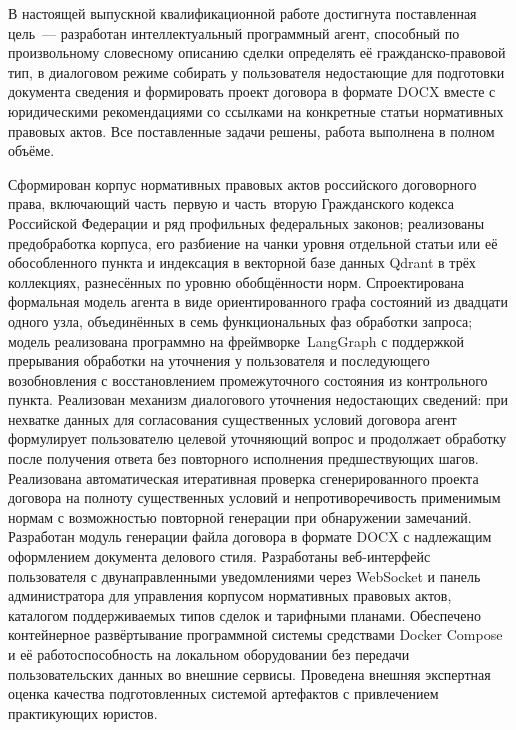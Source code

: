 \conclusion

В настоящей выпускной квалификационной работе достигнута поставленная цель~--- разработан интеллектуальный программный агент, способный по произвольному словесному описанию сделки определять её гражданско-правовой тип, в диалоговом режиме собирать у пользователя недостающие для подготовки документа сведения и формировать проект договора в формате DOCX вместе с юридическими рекомендациями со ссылками на конкретные статьи нормативных правовых актов. Все поставленные задачи решены, работа выполнена в полном объёме.

Сформирован корпус нормативных правовых актов российского договорного права, включающий часть~первую и часть~вторую Гражданского кодекса Российской Федерации и ряд профильных федеральных законов; реализованы предобработка корпуса, его разбиение на чанки уровня отдельной статьи или её обособленного пункта и индексация в векторной базе данных Qdrant в трёх коллекциях, разнесённых по уровню обобщённости норм. Спроектирована формальная модель агента в виде ориентированного графа состояний из двадцати одного узла, объединённых в семь функциональных фаз обработки запроса; модель реализована программно на фреймворке~LangGraph с поддержкой прерывания обработки на уточнения у пользователя и последующего возобновления с восстановлением промежуточного состояния из контрольного пункта. Реализован механизм диалогового уточнения недостающих сведений: при нехватке данных для согласования существенных условий договора агент формулирует пользователю целевой уточняющий вопрос и продолжает обработку после получения ответа без повторного исполнения предшествующих шагов. Реализована автоматическая итеративная проверка сгенерированного проекта договора на полноту существенных условий и непротиворечивость применимым нормам с возможностью повторной генерации при обнаружении замечаний. Разработан модуль генерации файла договора в формате DOCX с надлежащим оформлением документа делового стиля. Разработаны веб-интерфейс пользователя с двунаправленными уведомлениями через WebSocket и панель администратора для управления корпусом нормативных правовых актов, каталогом поддерживаемых типов сделок и тарифными планами. Обеспечено контейнерное развёртывание программной системы средствами Docker Compose и её работоспособность на локальном оборудовании без передачи пользовательских данных во внешние сервисы. Проведена внешняя экспертная оценка качества подготовленных системой артефактов с привлечением практикующих юристов.

